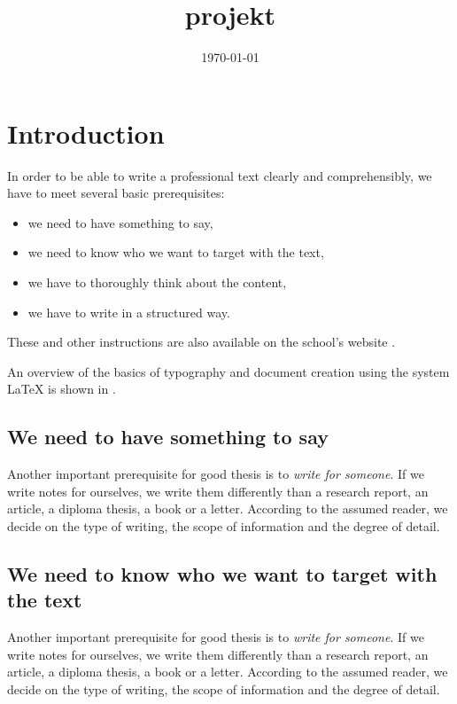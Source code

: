 \documentclass[english,odsaz]{fitthesis}
\date{\today}
\title{projekt}
\begin{document}
\maketitle
\setlength{\parskip}{0pt}
{\hypersetup{hidelinks}\tableofcontents}
\iftotalfigures\listoffigures\fi
\iftotaltables\listoftables\fi
\iftwoside\cleardoublepage\fi
\setlength{\parskip}{0.5\bigskipamount}

\chapter{Introduction}
\label{sec-1}
In order to be able to write a professional text clearly and comprehensibly, we
have to meet several basic prerequisites:
\begin{itemize}
\item we need to have something to say,
\item we need to know who we want to target with the text,
\item we have to thoroughly think about the content,
\item we have to write in a structured way.
\end{itemize}

These and other instructions are also available on the school's website
\cite{fitWeb}.

An overview of the basics of typography and document creation using the system
\LaTeX{} is shown in \cite{Rybicka}.

\section{We need to have something to say}
\label{sec-1-1}
Another important prerequisite for good thesis is to \emph{write for someone}. If
we write notes for ourselves, we write them differently than a research report,
an article, a diploma thesis, a book or a letter. According to the assumed
reader, we decide on the type of writing, the scope of information and the
degree of detail.

\section{We need to know who we want to target with the text}
\label{sec-1-2}
Another important prerequisite for good thesis is to \emph{write for someone}. If
we write notes for ourselves, we write them differently than a research report,
an article, a diploma thesis, a book or a letter. According to the assumed
reader, we decide on the type of writing, the scope of information and the
degree of detail.
\end{document}
